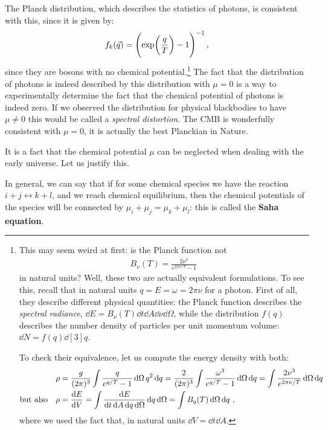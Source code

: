 \documentclass[main.tex]{subfiles}
\begin{document}
The Planck distribution, which describes the statistics of photons, is consistent with this, since it is given by: 
%
\begin{equation}
  f_k(\vec{q}) = \qty(\exp(\frac{q}{T}) -1 )^{-1}
\,,
\end{equation}
%
since they are bosons with no chemical potential.\footnote{This may seem weird at first: is the Planck function not 
%
\begin{align}
B_{\nu } (T) = \frac{2\nu^3}{e^{ 2 \pi \nu / T} -1 }
\,
\end{align}
%
in natural units?
Well, these two are actually equivalent formulations. To see this, recall that in natural units \(q = E = \omega = 2 \pi \nu \) for a photon. First of all, they describe different physical quantities: the Planck function describes the \emph{spectral radiance}, \(\dd{E} = B_\nu (T) \dd{t} \dd{A} \dd{\nu } \dd{\Omega }\), while the distribution \(f(q)\) describes the number density of particles per unit momentum volume: \(\dd{N} = f(q) \dd[3]{q}\).  

To check their equivalence, let us compute the energy density with both: 
%
\begin{align}
\rho &=  \frac{g}{(2\pi )^3} \int \frac{q}{e^{q/T}-1} \dd{\Omega } q^2 \dd{q} = \frac{2}{(2\pi )^3}\int \frac{ \omega^3}{e^{q/T}-1} \dd{\Omega } \dd{q}  
= \int \frac{2 \nu^3}{e^{2 \pi \nu /T}} \dd{\Omega } \dd{q}
\\
\text{but also}\quad\rho &= \dv{E}{V} = \int \frac{ \dd{E}}{ \dd{t} \dd{A} \dd{q} \dd{\Omega }} \dd{q} \dd{\Omega } = \int B_q(T) \dd{\Omega } \dd{q}
\,,
\end{align}
%
where we used the fact that, in natural units \(\dd{V} = \dd{t} \dd{A}\).
}
The fact that the distribution of photons is indeed described by this distribution with \(\mu =0\) is a way to experimentally determine the fact that the chemical potential of photons is indeed zero. If we observed the distribution for physical blackbodies to have \(\mu \neq 0\) this would be called a \emph{spectral distortion}. The CMB is wonderfully consistent with \(\mu =0\), it is actually the best Planckian in Nature.

It is a fact that the chemical potential \(\mu \) can be neglected when dealing with the early universe. Let us justify this.

In general, we can say that if for some chemical species we have the reaction \(i+j \leftrightarrow k+l\), and we reach chemical equilibrium, then the chemical potentials of the species will be connected by \(\mu _i + \mu _j = \mu _k + \mu _l\): this is called the \textbf{Saha equation}.
\end{document}
